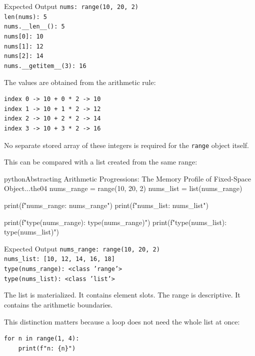 \begin{iobox}{Expected Output}
\texttt{nums: range(10, 20, 2)} \\
\texttt{len(nums): 5} \\
\texttt{nums.\_\_len\_\_(): 5} \\
\texttt{nums[0]: 10} \\
\texttt{nums[1]: 12} \\
\texttt{nums[2]: 14} \\
\texttt{nums.\_\_getitem\_\_(3): 16} \\
\end{iobox}


The values are obtained from the arithmetic rule:

\begin{verbatim}
index 0 -> 10 + 0 * 2 -> 10
index 1 -> 10 + 1 * 2 -> 12
index 2 -> 10 + 2 * 2 -> 14
index 3 -> 10 + 3 * 2 -> 16
\end{verbatim}

No separate stored array of these integers is required for the \texttt{range} object itself.

This can be compared with a list created from the same range:

\begin{codebox}[]{python}{Abstracting Arithmetic Progressions: The Memory Profile of Fixed-Space Object...}{the04}
nums_range = range(10, 20, 2)
nums_list = list(nums_range)

print(f"nums_range: {nums_range}")
print(f"nums_list: {nums_list}")

print(f"type(nums_range): {type(nums_range)}")
print(f"type(nums_list): {type(nums_list)}")
\end{codebox}


\begin{iobox}{Expected Output}
\texttt{nums\_range: range(10, 20, 2)} \\
\texttt{nums\_list: [10, 12, 14, 16, 18]} \\
\texttt{type(nums\_range): <class 'range'>} \\
\texttt{type(nums\_list): <class 'list'>} \\
\end{iobox}


The list is materialized. It contains element slots. The range is descriptive. It contains the arithmetic boundaries.

This distinction matters because a loop does not need the whole list at once:

\begin{verbatim}
for n in range(1, 4):
    print(f"n: {n}")
\end{verbatim}

